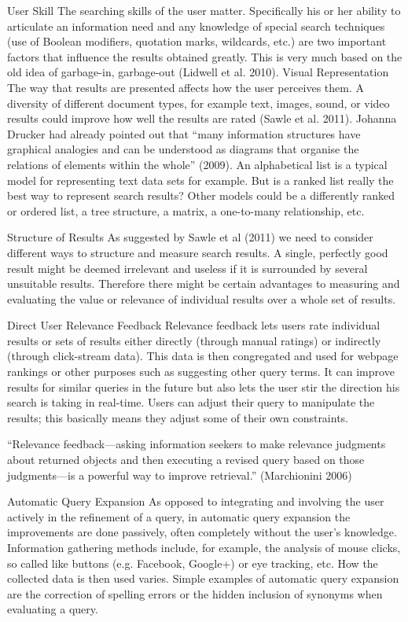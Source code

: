 User Skill   The searching skills of the user matter. Specifically his or her ability to articulate an information need and any knowledge of special search techniques (use of Boolean modifiers, quotation marks, wildcards, etc.) are two important factors that influence the results obtained greatly. This is very much based on the old idea of garbage-in, garbage-out (Lidwell et al. 2010).
Visual Representation   The way that results are presented affects how the user perceives them. A diversity of different document types, for example text, images, sound, or video results could improve how well the results are rated (Sawle et al. 2011). Johanna Drucker had already pointed out that ``many information structures have graphical analogies and can be understood as diagrams that organise the relations of elements within the whole'' (2009). An alphabetical list is a typical model for representing text data sets for example. But is a ranked list really the best way to represent search results? Other models could be a differently ranked or ordered list, a tree structure, a matrix, a one-to-many relationship, etc.

Structure of Results  As suggested by Sawle et al (2011) we need to consider different ways to structure and measure search results. A single, perfectly good result might be deemed irrelevant and useless if it is surrounded by several unsuitable results. Therefore there might be certain advantages to measuring and evaluating the value or relevance of individual results over a whole set of results.

Direct User Relevance Feedback   Relevance feedback lets users rate individual results or sets of results either directly (through manual ratings) or indirectly (through click-stream data). This data is then congregated and used for webpage rankings or other purposes such as suggesting other query terms. It can improve results for similar queries in the future but also lets the user stir the direction his search is taking in real-time. Users can adjust their query to manipulate the results; this basically means they adjust some of their own constraints.

``Relevance feedback—asking information seekers to make relevance judgments about returned objects and then executing a revised query based on those judgments—is a powerful way to improve retrieval.'' (Marchionini 2006)

Automatic Query Expansion   As opposed to integrating and involving the user actively in the refinement of a query, in automatic query expansion the improvements are done passively, often completely without the user’s knowledge. Information gathering methods include, for example, the analysis of mouse clicks, so called like buttons (e.g. Facebook, Google+) or eye tracking, etc. How the collected data is then used varies. Simple examples of automatic query expansion are the correction of spelling errors or the hidden inclusion of synonyms when evaluating a query.

